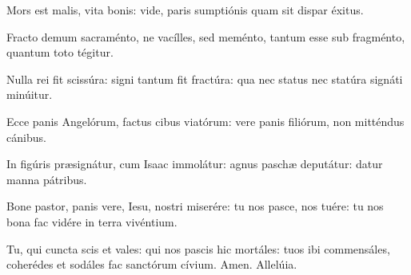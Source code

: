 {Mors est malis, vita bonis:
vide, paris sumptiónis
quam sit dispar éxitus.

Fracto demum sacraménto,
ne vacílles, sed meménto,
tantum esse sub fragménto,
quantum toto tégitur.

Nulla rei fit scissúra:
signi tantum fit fractúra:
qua nec status nec statúra
signáti minúitur.

Ecce panis Angelórum,
factus cibus viatórum:
vere panis filiórum,
non mitténdus cánibus.

In figúris præsignátur,
cum Isaac immolátur:
agnus paschæ deputátur:
datur manna pátribus.

Bone pastor, panis vere,
Iesu, nostri miserére:
tu nos pasce, nos tuére:
tu nos bona fac vidére
in terra vivéntium.

Tu, qui cuncta scis et vales:
qui nos pascis hic mortáles:
tuos ibi commensáles,
coherédes et sodáles
fac sanctórum cívium.
Amen. Allelúia.
}

